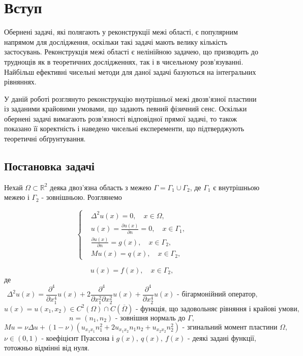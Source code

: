 \documentclass[12pt]{report}
\begin{document}
\tableofcontents


\chapter*{Вступ}
 
 \quad Обернені задачі, які полягають у реконструкції межі області, є популярним напрямом для дослідження, оскільки такі задачі мають велику кількість застосувань. Реконструкція межі області є нелінійною задачею, що призводить до труднощів як в теоретичних дослідженнях, так і в чисельному розв'язуванні. Найбільш ефективні чисельні методи для даної задачі базуються на інтегральних рівняннях. 
 
 У даній роботі розглянуто реконструкцію внутрішньої межі двозв'язної пластини із заданими крайовими умовами, що задають певний фізичний сенс. Оскільки обернені задачі вимагають розв'язності відповідної прямої задачі, то також показано її коректність і наведено чисельні експеременти, що підтверджують теоретичні обґрунтування.

 \section*{Постановка задачі}
Нехай $\Omega\subset \mathbb{R}^2$ деяка двоз'язна область з межею $\Gamma=\Gamma_1\cup\Gamma_2$, де $\Gamma_1$ є внутрішньою межею і $\Gamma_2$ - зовнішньою. Розглянемо

\begin{equation}
	\left\{
	\label{directProblem}
	\begin{split}
		&\Delta^2 u(x)=0, \quad x\in\Omega, \\
		&u(x)=\frac{\partial u(x)}{\partial n}=0, \quad x\in\Gamma_1, \\
		&\frac{\partial u(x)}{\partial n}=g(x), \quad x\in\Gamma_2, \\
		&Mu(x)=q(x), \quad x\in\Gamma_2,
	\end{split}
	\right.
\end{equation}

\begin{equation}
	\label{dataEq}
	u(x)=f(x), \quad x\in\Gamma_2,
\end{equation}
де 
$$\Delta^{2}u(x)=\frac{\partial^{4}}{\partial x_1^4}u(x)+2\frac{\partial^{4}}{\partial x_1^2\partial x_2^2}u(x)+\frac{\partial^{4}}{\partial x_2^4}u(x) \textrm{ - бігармонійний оператор,}
$$
 $$u(x)=u(x_1,x_2) \in C^2(\Omega)\cap C(\overline{\Omega}) \textrm{ - функція, що задовольняє рівняння і крайові умови}, $$
 $$n=(n_1, n_2) \textrm{ - зовнішня нормаль до }\Gamma,$$ 
 $$Mu=\nu\Delta u+(1-\nu)(u_{x_1 x_1}n_1^2+2u_{x_1 x_2}n_1 n_2+u_{x_2 x_2}n_2^2) \textrm{ - згинальний момент пластини } \Omega,
 $$ 
 $\nu\in (0, 1)$ - коефіцієнт Пуассона і $g(x), \ q(x),\  f(x)$ - деякі задані функції, тотожньо відмінні від нуля.
 
\end{document}

